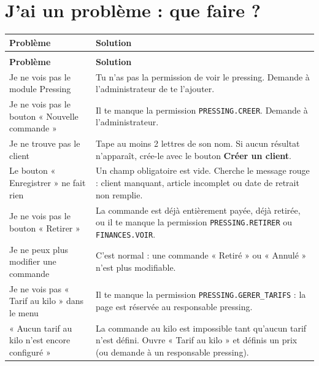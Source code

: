 \documentclass[12pt,a4paper]{article}
\begin{document}
\newpage

\section{J'ai un problème : que faire ?}

\begin{longtable}{>{\raggedright}p{5cm} p{9cm}}
\toprule
\textbf{Problème} & \textbf{Solution} \\
\midrule
\endfirsthead
\multicolumn{2}{c}{\textit{Suite de la FAQ}} \\
\toprule
\textbf{Problème} & \textbf{Solution} \\
\midrule
\endhead
\bottomrule
\endfoot

Je ne vois pas le module Pressing & Tu n'as pas la permission de voir le pressing. Demande à l'administrateur de te l'ajouter. \\

Je ne vois pas le bouton « Nouvelle commande » & Il te manque la permission \texttt{PRESSING.CREER}. Demande à l'administrateur. \\

Je ne trouve pas le client & Tape au moins 2 lettres de son nom. Si aucun résultat n'apparaît, crée-le avec le bouton \textbf{Créer un client}. \\

Le bouton « Enregistrer » ne fait rien & Un champ obligatoire est vide. Cherche le message rouge : client manquant, article incomplet ou date de retrait non remplie. \\

Je ne vois pas le bouton « Retirer » & La commande est déjà entièrement payée, déjà retirée, ou il te manque la permission \texttt{PRESSING.RETIRER} ou \texttt{FINANCES.VOIR}. \\

Je ne peux plus modifier une commande & C'est normal : une commande « Retiré » ou « Annulé » n'est plus modifiable. \\

Je ne vois pas « Tarif au kilo » dans le menu & Il te manque la permission \texttt{PRESSING.GERER\_TARIFS} : la page est réservée au responsable pressing. \\

« Aucun tarif au kilo n'est encore configuré » & La commande au kilo est impossible tant qu'aucun tarif n'est défini. Ouvre « Tarif au kilo » et définis un prix (ou demande à un responsable pressing). \\


\end{longtable}
\end{document}
